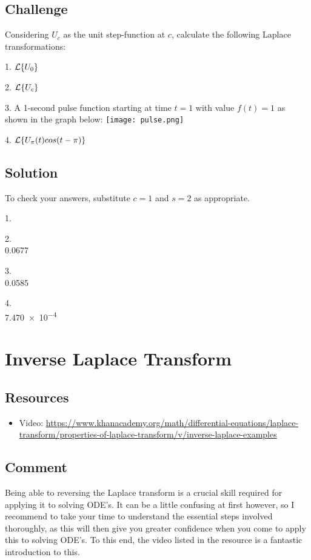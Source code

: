 \subsection*{Challenge}
Considering $U_c$ as the unit step-function at $c$, calculate the following Laplace transformations:

1. $\displaystyle \mathcal{L}\{U_0\}$

2. $\displaystyle \mathcal{L}\{U_c\}$

3. A 1-second pulse function starting at time $t=1$ with value $f(t)=1$ as shown in the graph below:
\texttt{[image: pulse.png]}

4. $\displaystyle \mathcal{L}\{U_\pi(t) cos(t-\pi)\}$

\subsection*{Solution}
To check your answers, substitute $c=1$ and $s=2$ as appropriate.

1.\\

2.\\
0.0677

3.\\
0.0585

4.\\
\num{7.470e-4}




\newpage
\section{Inverse Laplace Transform}

\subsection*{Resources}
\begin{itemize}
    \item Video: \url{https://www.khanacademy.org/math/differential-equations/laplace-transform/properties-of-laplace-transform/v/inverse-laplace-examples} %
\end{itemize}

\subsection*{Comment}
Being able to reversing the Laplace transform is a crucial skill required for applying it to solving ODE's. It can be a little confusing at first however, so I recommend to take your time to understand the essential steps involved thoroughly, as this will then give you greater confidence when you come to apply this to solving ODE's. To this end, the video listed in the resource is a fantastic introduction to this.


